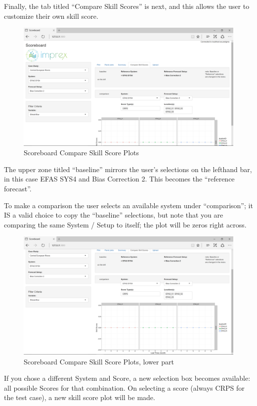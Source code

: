 \documentclass[logos,parttoc,morelanguage=french,morelanguage=german]{orsay-memoire}
\begin{document}
Finally, the tab titled ``Compare Skill Scores'' is next, and this allows the user to customize their own skill score.

\begin{figure}[H]
\centering
\includegraphics[width=0.9\linewidth]{images/isb4.png}
  \caption{Scoreboard Compare Skill Score Plots}
  \label{fig:isb4}
\end{figure}


The upper zone titled ``baseline'' mirrors the user's selections on the lefthand bar, in this case EFAS SYS4 and Bias Correction 2. This becomes the ``reference forecast''.

To make a comparison the user selects an available system under ``comparison''; it IS a valid choice to copy the ``baseline'' selections, but note that you are comparing the same System / Setup to itself; the plot will be zeros right across.

\begin{figure}[H]
\centering
\includegraphics[width=0.9\linewidth]{images/isb5.png}
  \caption{Scoreboard Compare Skill Score Plots, lower part}
  \label{fig:isb5}
\end{figure}

If you chose a different System and Score, a new selection box becomes available: all possible Scores for that combination. On selecting a score (always CRPS for the test case), a new skill score plot will be made.
\end{document}
